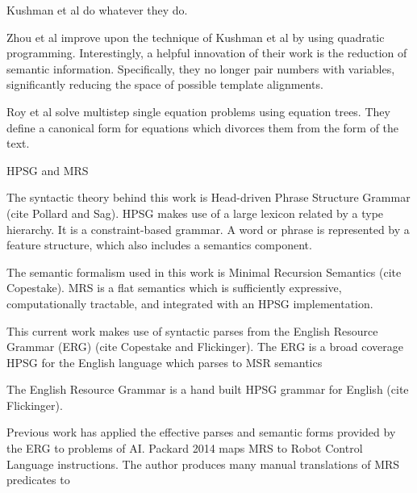 Kushman et al do whatever they do. 

Zhou et al improve upon the technique of Kushman et al by using quadratic programming. Interestingly, a helpful innovation of their work is the reduction of semantic information. Specifically, they no longer pair numbers with variables, significantly reducing the space of possible template alignments. 

Roy et al solve multistep single equation problems using equation trees. They define a canonical form for equations which divorces them from the form of the text. 

HPSG and MRS

The syntactic theory behind this work is Head-driven Phrase Structure Grammar (cite Pollard and Sag). HPSG makes use of a large lexicon related by a type hierarchy. It is a constraint-based grammar. A word or phrase is represented by a feature structure, which also includes a semantics component. 

The semantic formalism used in this work is Minimal Recursion Semantics (cite Copestake). MRS is a flat semantics which is sufficiently expressive, computationally tractable, and integrated with an HPSG implementation. 

This current work makes use of syntactic parses from the English Resource Grammar (ERG) (cite Copestake and Flickinger). The ERG is a broad coverage HPSG for the English language which parses to MSR semantics

The English Resource Grammar is a hand built HPSG grammar for English (cite Flickinger).

Previous work has applied the effective parses and semantic forms provided by the ERG to problems of AI. Packard 2014 maps MRS to Robot Control Language instructions. The author produces many manual translations of MRS predicates to 

